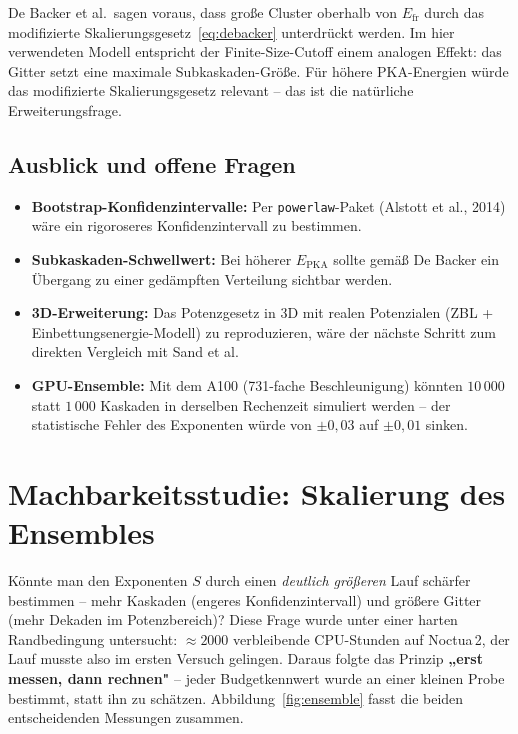 \documentclass[11pt,a4paper]{article}
\begin{document}
De Backer et al.\ sagen voraus, dass große Cluster oberhalb von $E_\text{fr}$
durch das modifizierte Skalierungsgesetz~\eqref{eq:debacker} unterdrückt werden.
Im hier verwendeten Modell entspricht der Finite-Size-Cutoff einem analogen Effekt:
das Gitter setzt eine maximale Subkaskaden-Größe. Für höhere PKA-Energien
würde das modifizierte Skalierungsgesetz relevant -- das ist die
natürliche Erweiterungsfrage.

\subsection{Ausblick und offene Fragen}

\begin{itemize}[itemsep=2pt]
\item \textbf{Bootstrap-Konfidenzintervalle:} Per \texttt{powerlaw}-Paket
  (Alstott et al., 2014) wäre ein rigoroseres Konfidenzintervall zu bestimmen.
\item \textbf{Subkaskaden-Schwellwert:} Bei höherer $E_\text{PKA}$ sollte
  gemäß De Backer ein Übergang zu einer gedämpften Verteilung sichtbar
  werden.
\item \textbf{3D-Erweiterung:} Das Potenzgesetz in 3D mit realen Potenzialen
  (ZBL + Einbettungsenergie-Modell) zu reproduzieren, wäre der nächste Schritt
  zum direkten Vergleich mit Sand et al.
\item \textbf{GPU-Ensemble:} Mit dem A100 (731-fache Beschleunigung) könnten
  $10\,000$ statt $1\,000$ Kaskaden in derselben Rechenzeit simuliert werden --
  der statistische Fehler des Exponenten würde von $\pm 0{,}03$ auf
  $\pm 0{,}01$ sinken.
\end{itemize}

\FloatBarrier
\section{Machbarkeitsstudie: Skalierung des Ensembles}
\label{sec:ensemble-scaling}

Könnte man den Exponenten $S$ durch einen \emph{deutlich größeren} Lauf
schärfer bestimmen -- mehr Kaskaden (engeres Konfidenzintervall) und größere
Gitter (mehr Dekaden im Potenzbereich)? Diese Frage wurde unter einer harten
Randbedingung untersucht: $\approx 2000$ verbleibende CPU-Stunden auf Noctua\,2,
der Lauf musste also im ersten Versuch gelingen. Daraus folgte das Prinzip
\textbf{„erst messen, dann rechnen"} -- jeder Budgetkennwert wurde an einer
kleinen Probe bestimmt, statt ihn zu schätzen. Abbildung~\ref{fig:ensemble}
fasst die beiden entscheidenden Messungen zusammen.
\end{document}
